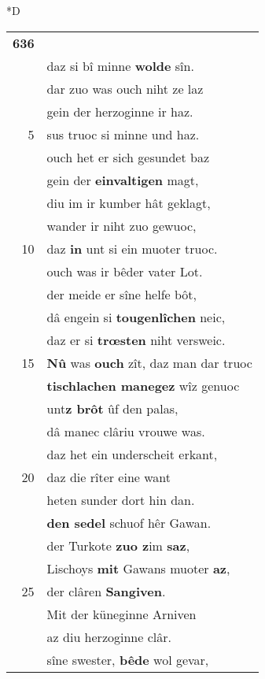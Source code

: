 \documentclass[8pt,a4paper,notitlepage]{article}
\begin{document}
\begin{table}[ht]
\begin{minipage}[t]{0.5\linewidth}
\small
\begin{center}*D
\end{center}
\begin{tabular}{rl}
\textbf{636} & \textit{\begin{large}G\end{large}}awan hôrte an dem vröuwelîn,\\ 
 & daz si bî minne \textbf{wolde} sîn.\\ 
 & dar zuo was ouch niht ze laz\\ 
 & gein der herzoginne ir haz.\\ 
5 & sus truoc si minne und haz.\\ 
 & ouch het er sich gesundet baz\\ 
 & gein der \textbf{einvaltigen} magt,\\ 
 & diu im ir kumber hât geklagt,\\ 
 & wander ir niht zuo gewuoc,\\ 
10 & daz \textbf{in} unt si ein muoter truoc.\\ 
 & ouch was ir bêder vater Lot.\\ 
 & der meide er sîne helfe bôt,\\ 
 & dâ engein si \textbf{tougenlîchen} neic,\\ 
 & daz er si \textbf{trœsten} niht versweic.\\ 
15 & \textbf{Nû} was \textbf{ouch} zît, daz man dar truoc\\ 
 & \textbf{tischlachen manegez} wîz genuoc\\ 
 & unt\textbf{z brôt} ûf den palas,\\ 
 & dâ manec clâriu vrouwe was.\\ 
 & daz het ein underscheit erkant,\\ 
20 & daz die rîter eine want\\ 
 & heten sunder dort hin dan.\\ 
 & \textbf{den sedel} schuof hêr Gawan.\\ 
 & der Turkote \textbf{zuo z}im \textbf{saz},\\ 
 & Lischoys \textbf{mit} Gawans muoter \textbf{az},\\ 
25 & der clâren \textbf{Sangiven}.\\ 
 & Mit der küneginne Arniven\\ 
 & az diu herzoginne clâr.\\ 
 & sîne swester, \textbf{bêde} wol gevar,\\ 

\end{tabular}
\end{minipage}
\end{table}
\end{document}
